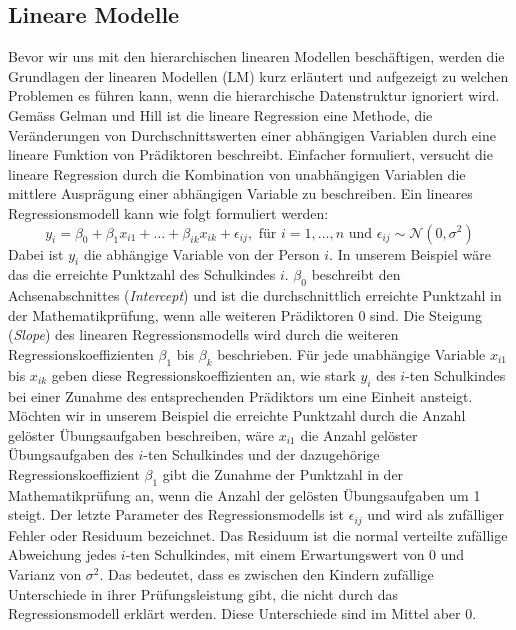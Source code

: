 \documentclass[12pt]{article}\usepackage[]{graphicx}\usepackage[]{color}
\begin{document}
\subsection{Lineare Modelle} \label{section:linear_model}
Bevor wir uns mit den hierarchischen linearen Modellen beschäftigen, werden die Grundlagen der linearen Modellen (LM) kurz erläutert und aufgezeigt zu welchen Problemen es führen kann, wenn die hierarchische Datenstruktur ignoriert wird. Gemäss Gelman und Hill \citeyearpar{andrew_data} ist die lineare Regression eine Methode, die Veränderungen von Durchschnittswerten einer abhängigen Variablen durch eine lineare Funktion von Prädiktoren beschreibt. Einfacher formuliert, versucht die lineare Regression durch die Kombination von unabhängigen Variablen die mittlere Ausprägung einer abhängigen Variable zu beschreiben. Ein lineares Regressionsmodell kann wie folgt formuliert werden:
\begin{equation} \label{eq:ols_model}
y_{i} = \beta_{0} + \beta_{1}x_{i1} + \dots + \beta_{ik}x_{ik} + \epsilon_{ij}, \text{ für } i = 1, \dots, n \text{ und } \epsilon_{ij} \sim \mathcal{N}(0,\sigma^{2})
\end{equation}
Dabei ist $y_{i}$ die abhängige Variable von der Person $i$. In unserem Beispiel wäre das die erreichte Punktzahl des Schulkindes $i$. $\beta_0$ beschreibt den Achsenabschnittes (\textit{Intercept}) und ist die durchschnittlich erreichte Punktzahl in der Mathematikprüfung, wenn alle weiteren Prädiktoren 0 sind. Die Steigung (\textit{Slope}) des linearen Regressionsmodells wird durch die weiteren Regressionskoeffizienten $\beta_{1}$ bis $\beta_{k}$ beschrieben. Für jede unabhängige Variable $x_{i1}$ bis $x_{ik}$ geben diese Regressionskoeffizienten an, wie stark $y_{i}$ des $i$-ten Schulkindes bei einer Zunahme des entsprechenden Prädiktors um eine Einheit ansteigt. Möchten wir in unserem Beispiel die erreichte Punktzahl durch die Anzahl gelöster Übungsaufgaben beschreiben, wäre $x_{i1}$ die Anzahl gelöster Übungsaufgaben des $i$-ten Schulkindes und der dazugehörige Regressionskoeffizient $\beta_{1}$ gibt die Zunahme der Punktzahl in der Mathematikprüfung an, wenn die Anzahl der gelösten Übungsaufgaben um 1 steigt. Der letzte Parameter des Regressionsmodells ist $\epsilon_{ij}$ und wird als zufälliger Fehler oder Residuum bezeichnet. Das Residuum ist die normal verteilte zufällige Abweichung jedes $i$-ten Schulkindes, mit einem Erwartungswert von 0 und Varianz von $\sigma^{2}$. Das bedeutet, dass es zwischen den Kindern zufällige Unterschiede in ihrer Prüfungsleistung gibt, die nicht durch das Regressionsmodell erklärt werden. Diese Unterschiede sind im Mittel aber 0. 
\end{document}
